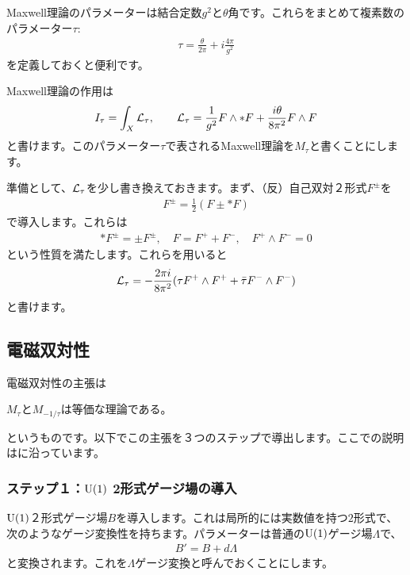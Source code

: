 \documentclass[generalized_symmetry.tex]{subfiles}
\begin{document}
Maxwell理論のパラメーターは結合定数$g^2$と$\theta$角です。これらをまとめて複素数のパラメーター$\tau$:
\begin{align}
  \tau=\frac{\theta}{2\pi}+i\frac{4\pi}{g^2}
\end{align}
を定義しておくと便利です。

Maxwell理論の作用は
\begin{align}
  I_{\tau}=\int_{X} \mathcal{L}_{\tau},\qquad
  \mathcal{L}_{\tau}=\frac{1}{g^2}F\wedge *F+\frac{i\theta}{8\pi^2}F\wedge F
\end{align}
と書けます。このパラメーター$\tau$で表されるMaxwell理論を$M_{\tau}$と書くことにします。

準備として、$\mathcal{L}_{\tau}$を少し書き換えておきます。まず、（反）自己双対２形式$F^{\pm}$を
\begin{align}
  F^{\pm}=\frac{1}{2}(F\pm *F)
\end{align}
で導入します。これらは
\begin{align}
  *F^{\pm}=\pm F^{\pm},\quad F=F^{+}+F^{-},\quad F^{+}\wedge F^{-}=0
\end{align}
という性質を満たします。これらを用いると
\begin{align}
  \mathcal{L}_{\tau}=-\frac{2\pi i}{8\pi^2}(\tau F^{+}\wedge F^{+}+\bar{\tau} F^{-}\wedge F^{-})
\end{align}
と書けます。

\subsection{電磁双対性}
電磁双対性の主張は
\begin{emphasize}
  $M_{\tau}$と$M_{-1/\tau}$は等価な理論である。
\end{emphasize}
というものです。以下でこの主張を３つのステップで導出します。ここでの説明は\cite{Witten:1995gf}に沿っています。

\subsubsection{ステップ１：\texorpdfstring{$\mbox{U}(1)$}{U(1)} 2形式ゲージ場の導入}

$\mbox{U}(1)$２形式ゲージ場$B$を導入します。これは局所的には実数値を持つ$2$形式で、次のようなゲージ変換性を持ちます。パラメーターは普通の$\mbox{U}(1)$ゲージ場$\Lambda$で、
\begin{align}
  B'= B + d\Lambda
\end{align}
と変換されます。これを$\Lambda$ゲージ変換と呼んでおくことにします。
\end{document}
